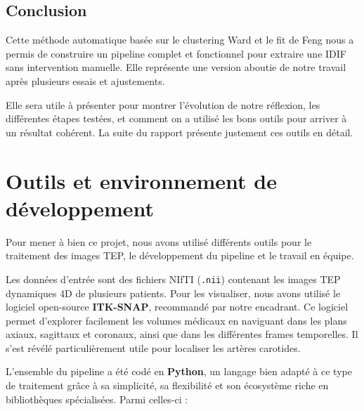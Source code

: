 \documentclass{article}
\begin{document}
        \vspace{0.5em}
    \subsection*{Conclusion}

        \noindent
            Cette méthode automatique basée sur le clustering Ward et le fit de Feng nous a permis de construire un pipeline complet et fonctionnel pour extraire une IDIF sans intervention manuelle. Elle représente une version aboutie de notre travail après plusieurs essais et ajustements.
        
        \noindent
            Elle sera utile à présenter pour montrer l’évolution de notre réflexion, les différentes étapes testées, et comment on a utilisé les bons outils pour arriver à un résultat cohérent. La suite du rapport présente justement ces outils en détail.

        
                
            
        

    \newpage
    \section{Outils et environnement de développement}
    \noindent
        Pour mener à bien ce projet, nous avons utilisé différents outils pour le traitement des images TEP, le développement du pipeline et le travail en équipe.
    
        Les données d’entrée sont des fichiers NIfTI (\texttt{.nii}) contenant les images TEP dynamiques 4D de plusieurs patients. Pour les visualiser, nous avons utilisé le logiciel open-source \textbf{ITK-SNAP}, recommandé par notre encadrant. Ce logiciel permet d’explorer facilement les volumes médicaux en naviguant dans les plans axiaux, sagittaux et coronaux, ainsi que dans les différentes frames temporelles. Il s’est révélé particulièrement utile pour localiser les artères carotides.
    
        L’ensemble du pipeline a été codé en \textbf{Python}, un langage bien adapté à ce type de traitement grâce à sa simplicité, sa flexibilité et son écosystème riche en bibliothèques spécialisées. Parmi celles-ci :
    
\end{document}
